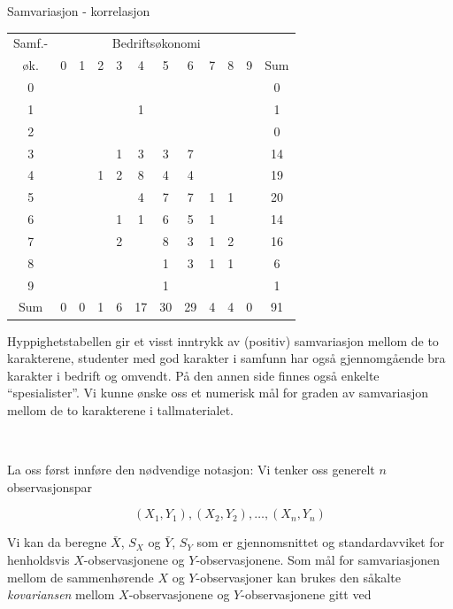 \begin{eksempel} {Samvariasjon - korrelasjon}
            
\begin{center}                 
 \begin{tabular}{|c|cccccccccc|c|} \hline
Samf.-    &  \multicolumn{10}{c|}{Bedriftsøkonomi}&   \\ \cline{2-11}
øk.    & 0 & 1 & 2 & 3 & 4 & 5 & 6 & 7 & 8 & 9 & Sum \\ \hline
  0       &   &   &   &   &   &   &   &   &   &   &  0   \\
  1       &   &   &   &   & 1 &   &   &   &   &   &  1   \\
  2       &   &   &   &   &   &   &   &   &   &   &  0   \\
  3       &   &   &   & 1 & 3 & 3 & 7 &   &   &   & 14   \\
  4       &   &   & 1 & 2 & 8 & 4 & 4 &   &   &   & 19   \\
  5       &   &   &   &   & 4 & 7 & 7 & 1 & 1 &   & 20   \\
  6       &   &   &   & 1 & 1 & 6 & 5 & 1 &   &   & 14   \\
  7       &   &   &   & 2 &   & 8 & 3 & 1 & 2 &   & 16   \\
  8       &   &   &   &   &   & 1 & 3 & 1 & 1 &   &  6   \\
  9       &   &   &   &   &   & 1 &   &   &   &   &  1   \\ \hline
Sum       & 0 & 0 & 1 & 6 &17 &30 &29 & 4 & 4 & 0 & 91   \\ \hline
  \end{tabular}                
\end{center}  
                                                                    
\noindent                          
Hyppighetstabellen gir et visst inntrykk av (positiv) samvariasjon mellom
de to karakterene, studenter med god karakter i
samfunn har også gjennomgående bra karakter i bedrift og omvendt. 
På den annen side finnes også enkelte ``spesialister''.  Vi kunne
ønske oss et numerisk mål for graden av samvariasjon mellom de to
karakterene i tallmaterialet.
\end{eksempel}\

La oss først innføre den nødvendige notasjon: Vi tenker oss generelt
$n$ observasjonspar
                                               
 \[ (X_{1},Y_{1}), (X_{2},Y_{2}), \ldots , (X_{n},Y_{n}) \]
                
\noindent Vi kan da beregne $\bar{X}$, $S_{X}$ og $\bar{Y}$, $S_{Y}$ som er
gjennomsnittet
og standardavviket for henholdsvis $X$-observasjonene og $Y$-observasjonene.
Som mål for samvariasjonen mellom de sammenhørende $X$ og
$Y$-observasjoner kan brukes den såkalte {\em kovariansen} mellom
 $X$-observasjonene og $Y$-observasjo\-nene gitt ved

